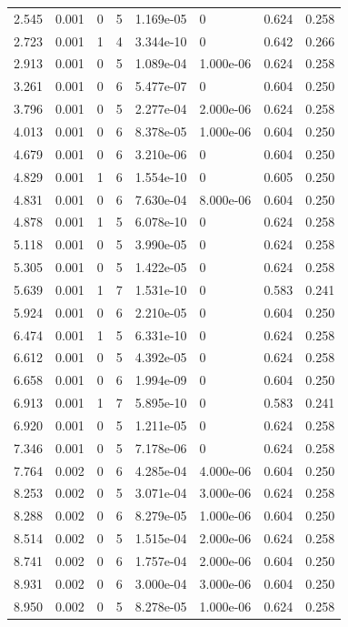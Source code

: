 \documentclass[preview]{standalone}
\begin{document}
{{\begin{tabular}{L{1.2cm}C{1.2cm} C{0.3cm}C{0.5cm} C{1.4cm}C{1.4cm} C{1.4cm}C{1.4cm}}
  2.545  &  0.001  & 0     &  5 &  1.169e-05  & 0  & 0.624 &  0.258   \\ 
  2.723  &  0.001  & 1     &  4 &  3.344e-10  & 0  & 0.642 &  0.266   \\ 
  2.913  &  0.001  & 0     &  5 &  1.089e-04  & 1.000e-06  & 0.624 &  0.258   \\ 
  3.261  &  0.001  & 0     &  6 &  5.477e-07  & 0  & 0.604 &  0.250   \\ 
  3.796  &  0.001  & 0     &  5 &  2.277e-04  & 2.000e-06  & 0.624 &  0.258   \\ 
  4.013  &  0.001  & 0     &  6 &  8.378e-05  & 1.000e-06  & 0.604 &  0.250   \\ 
  4.679  &  0.001  & 0     &  6 &  3.210e-06  & 0  & 0.604 &  0.250   \\ 
  4.829  &  0.001  & 1     &  6 &  1.554e-10  & 0  & 0.605 &  0.250   \\ 
  4.831  &  0.001  & 0     &  6 &  7.630e-04  & 8.000e-06  & 0.604 &  0.250   \\ 
  4.878  &  0.001  & 1     &  5 &  6.078e-10  & 0  & 0.624 &  0.258   \\ 
  5.118  &  0.001  & 0     &  5 &  3.990e-05  & 0  & 0.624 &  0.258   \\ 
  5.305  &  0.001  & 0     &  5 &  1.422e-05  & 0  & 0.624 &  0.258   \\ 
  5.639  &  0.001  & 1     &  7 &  1.531e-10  & 0  & 0.583 &  0.241   \\ 
  5.924  &  0.001  & 0     &  6 &  2.210e-05  & 0  & 0.604 &  0.250   \\ 
  6.474  &  0.001  & 1     &  5 &  6.331e-10  & 0  & 0.624 &  0.258   \\ 
  6.612  &  0.001  & 0     &  5 &  4.392e-05  & 0  & 0.624 &  0.258   \\ 
  6.658  &  0.001  & 0     &  6 &  1.994e-09  & 0  & 0.604 &  0.250   \\ 
  6.913  &  0.001  & 1     &  7 &  5.895e-10  & 0  & 0.583 &  0.241   \\ 
  6.920  &  0.001  & 0     &  5 &  1.211e-05  & 0  & 0.624 &  0.258   \\ 
  7.346  &  0.001  & 0     &  5 &  7.178e-06  & 0  & 0.624 &  0.258   \\ 
  7.764  &  0.002  & 0     &  6 &  4.285e-04  & 4.000e-06  & 0.604 &  0.250   \\ 
  8.253  &  0.002  & 0     &  5 &  3.071e-04  & 3.000e-06  & 0.624 &  0.258   \\ 
  8.288  &  0.002  & 0     &  6 &  8.279e-05  & 1.000e-06  & 0.604 &  0.250   \\ 
  8.514  &  0.002  & 0     &  5 &  1.515e-04  & 2.000e-06  & 0.624 &  0.258   \\ 
  8.741  &  0.002  & 0     &  6 &  1.757e-04  & 2.000e-06  & 0.604 &  0.250   \\ 
  8.931  &  0.002  & 0     &  6 &  3.000e-04  & 3.000e-06  & 0.604 &  0.250   \\ 
  8.950  &  0.002  & 0     &  5 &  8.278e-05  & 1.000e-06  & 0.624 &  0.258   \\ 
\hline 
\end{tabular} 

}}
\end{document}
